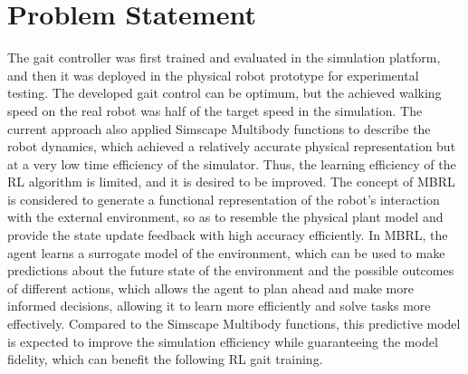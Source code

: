 \section{Problem Statement}
 The gait controller was first trained and evaluated in the simulation platform, and then it was deployed in the physical robot prototype for experimental testing. The developed gait control can be optimum, but the achieved walking speed on the real robot was half of the target speed in the simulation\cite{jiSynthesizingOptimalGait2022}. The current approach also applied Simscape\textsuperscript{\textregistered} Multibody functions to describe the robot dynamics, which achieved a relatively accurate physical representation but at a very low time efficiency of the simulator. Thus, the learning efficiency of the \ac{RL} algorithm is limited, and it is desired to be improved. The concept of \ac{MBRL} is considered to generate a functional representation of the robot’s interaction with the external environment, so as to resemble the physical plant model and provide the state update feedback with high accuracy efficiently\cite{rayModelBasedReinforcementLearning2010}. In \ac{MBRL}, the agent learns a surrogate model of the environment, which can be used to make predictions about the future state of the environment and the possible outcomes of different actions, which allows the agent to plan ahead and make more informed decisions, allowing it to learn more efficiently and solve tasks more effectively\cite{polydorosSurveyModelBasedReinforcement2017}. Compared to the Simscape\textsuperscript{\textregistered} Multibody functions, this predictive model is expected to improve the simulation efficiency while guaranteeing the model fidelity, which can benefit the following \ac{RL} gait training. 
 

